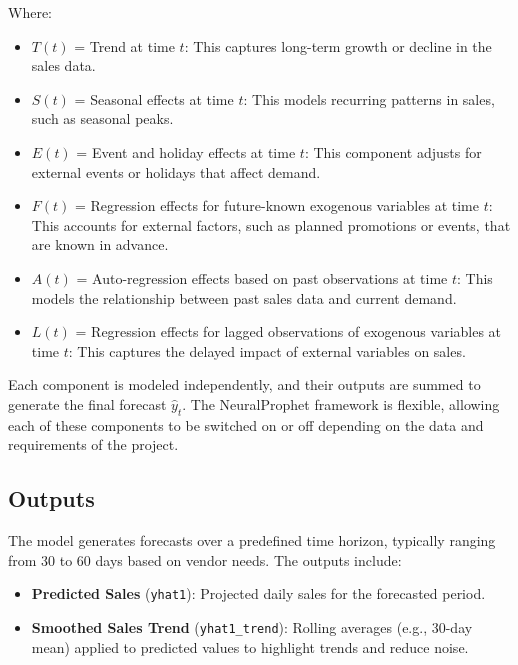 Where:
\begin{itemize}
    \item \( T(t) \) = Trend at time \( t \): This captures long-term growth or decline in the sales data.
    \item \( S(t) \) = Seasonal effects at time \( t \): This models recurring patterns in sales, such as seasonal peaks.
    \item \( E(t) \) = Event and holiday effects at time \( t \): This component adjusts for external events or holidays that affect demand.
    \item \( F(t) \) = Regression effects for future-known exogenous variables at time \( t \): This accounts for external factors, such as planned promotions or events, that are known in advance.
    \item \( A(t) \) = Auto-regression effects based on past observations at time \( t \): This models the relationship between past sales data and current demand.
    \item \( L(t) \) = Regression effects for lagged observations of exogenous variables at time \( t \): This captures the delayed impact of external variables on sales.
\end{itemize}

Each component is modeled independently, and their outputs are summed to generate the final forecast \( \hat{y}_t \). The NeuralProphet framework is flexible, allowing each of these components to be switched on or off depending on the data and requirements of the project.

\subsection{Outputs}

The model generates forecasts over a predefined time horizon, typically ranging from 30 to 60 days based on vendor needs. The outputs include:

\begin{itemize}
    \item \textbf{Predicted Sales} (\texttt{yhat1}): Projected daily sales for the forecasted period.
    \item \textbf{Smoothed Sales Trend} (\texttt{yhat1\_trend}): Rolling averages (e.g., 30-day mean) applied to predicted values to highlight trends and reduce noise.
\end{itemize}

